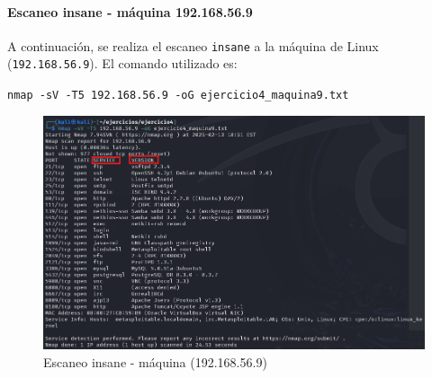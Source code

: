 \documentclass[a4paper,12pt]{article} %
\begin{document}
        
   \paragraph{Escaneo insane - máquina 192.168.56.9}
    A continuación, se realiza el escaneo \texttt{insane} a la máquina de Linux (\texttt{192.168.56.9}). El comando utilizado es:

    \begin{center}
    \texttt{nmap -sV -T5 192.168.56.9  -oG ejercicio4\_maquina9.txt}
    \end{center}

        \begin{figure} [hp!]
         \centering
         \includegraphics[width=1\textwidth]{Imagenes/insane9.png}
         \caption{Escaneo insane - máquina (192.168.56.9) }
         \label{fig:wireshark2}
        \end{figure}
\end{document}
